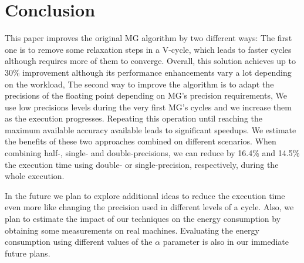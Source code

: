 \section{Conclusion}
\label{sec:conclusions}

This paper improves the original MG algorithm by two different ways: 
The first one is to remove some relaxation steps in a V-cycle, which leads to faster cycles although requires more of them to converge.
Overall, this solution achieves up to 30\% improvement although its performance enhancements vary a lot depending on the workload,
The second way to improve the algorithm is to adapt the precisions of the floating point depending on MG's precision requirements,
We use low precisions levels during the very first MG's cycles and we increase them as the execution progresses. 
Repeating this operation until reaching the maximum available accuracy available leads to significant speedups.
We estimate the benefits of these two approaches combined on different scenarios. 
When combining half-, single- and double-precisions, we can reduce by 16.4\% and 14.5\% the execution time using double- or single-precision, respectively, during the whole execution. 

In the future we plan to explore additional ideas to reduce the execution time even more like changing the precision used in different levels of a cycle. 
Also, we plan to estimate the impact of our techniques on the energy consumption by obtaining some measurements on real machines.
Evaluating the energy consumption using different values of the $\alpha$ parameter is also in our immediate future plans.
